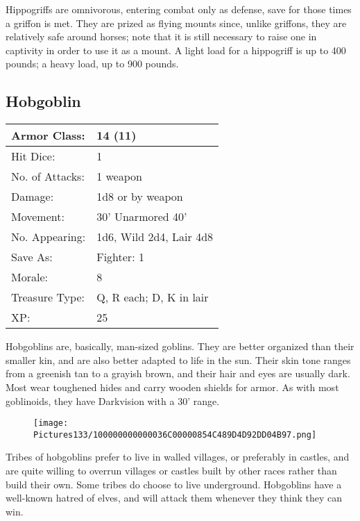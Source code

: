 \documentclass[a4paper,twoside,openany,10pt]{book}
\begin{document}
\begin{multicols}{2}
Hippogriffs are omnivorous, entering combat only as defense, save for those times a griffon is met. They are prized as flying mounts since, unlike griffons, they are relatively safe around horses; note that it is still necessary to raise one in captivity in order to use it as a mount. A light load for a hippogriff is up to 400 pounds; a heavy load, up to 900 pounds.

\subsection*{Hobgoblin}\label{hobgoblin}

\begin{tabularx}{0.50\textwidth}{@{}lX@{}}
Armor Class: & 14 (11) \\\hline
Hit Dice: & 1 \\\hline
No. of Attacks: & 1 weapon \\\hline
Damage: & 1d8 or by weapon \\\hline
Movement: & 30' Unarmored 40' \\\hline
No. Appearing: & 1d6, Wild 2d4, Lair 4d8 \\\hline
Save As: & Fighter: 1 \\\hline
Morale: & 8 \\\hline
Treasure Type: & Q, R each; D, K in lair \\\hline
XP: & 25 \\\hline
\end{tabularx}

Hobgoblins are, basically, man-sized goblins. They are better organized than their smaller kin, and are also better adapted to life in the sun. Their skin tone ranges from a greenish tan to a grayish brown, and their hair and eyes are usually dark. Most wear toughened hides and carry wooden shields for armor. As with most goblinoids, they have Darkvision with a 30' range.

\begin{wrapfigure}{r}{0.25\textwidth}
	\texttt{[image: Pictures133/100000000000036C00000854C489D4D92DD04B97.png]}
\end{wrapfigure}

Tribes of hobgoblins prefer to live in walled villages, or preferably in castles, and are quite willing to overrun villages or castles built by other races rather than build their own. Some tribes do choose to live underground. Hobgoblins have a well-known hatred of elves, and will attack them whenever they think they can win.


\end{multicols}
\end{document}
